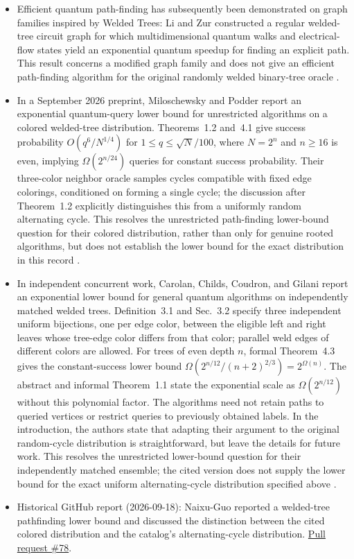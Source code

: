 \begin{itemize}
  \item Efficient quantum path-finding has subsequently been demonstrated on
graph families inspired by Welded Trees: Li and Zur constructed a regular
welded-tree circuit graph for which multidimensional quantum walks and
electrical-flow states yield an exponential quantum speedup for finding an
explicit path.  This result concerns a modified graph family and does not
give an efficient path-finding algorithm for the original randomly welded
binary-tree oracle
.

  \item In a September 2026 preprint, Miloschewsky and Podder report an exponential quantum-query lower bound for unrestricted algorithms on a colored welded-tree distribution. Theorems~1.2 and~4.1 give success probability $O(q^6/N^{1/4})$ for $1\leq q\leq\sqrt N/100$, where $N=2^n$ and $n\geq16$ is even, implying $\Omega(2^{n/24})$ queries for constant success probability. Their three-color neighbor oracle samples cycles compatible with fixed edge colorings, conditioned on forming a single cycle; the discussion after Theorem~1.2 explicitly distinguishes this from a uniformly random alternating cycle. This resolves the unrestricted path-finding lower-bound question for their colored distribution, rather than only for genuine rooted algorithms, but does not establish the lower bound for the exact distribution in this record .

  \item In independent concurrent work, Carolan, Childs, Coudron, and Gilani report an exponential lower bound for general quantum algorithms on independently matched welded trees. Definition~3.1 and Sec.~3.2 specify three independent uniform bijections, one per edge color, between the eligible left and right leaves whose tree-edge color differs from that color; parallel weld edges of different colors are allowed. For trees of even depth $n$, formal Theorem~4.3 gives the constant-success lower bound $\Omega(2^{n/12}/(n+2)^{2/3})=2^{\Omega(n)}$. The abstract and informal Theorem~1.1 state the exponential scale as $\Omega(2^{n/12})$ without this polynomial factor. The algorithms need not retain paths to queried vertices or restrict queries to previously obtained labels. In the introduction, the authors state that adapting their argument to the original random-cycle distribution is straightforward, but leave the details for future work. This resolves the unrestricted lower-bound question for their independently matched ensemble; the cited version does not supply the lower bound for the exact uniform alternating-cycle distribution specified above .

  \item Historical GitHub report (2026-09-18): Naixu-Guo reported a welded-tree pathfinding lower bound and discussed the distinction between the cited colored distribution and the catalog's alternating-cycle distribution. \href{https://github.com/Naixu-Guo/quantum-open-problems/pull/78}{Pull request \#78}.
\end{itemize}

